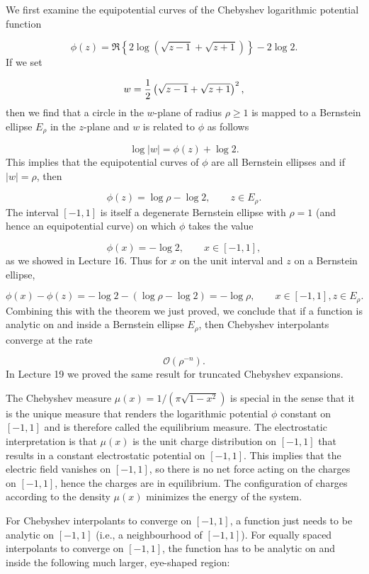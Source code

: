 \documentclass[12pt,a4paper]{article}
\begin{document}
We first examine the equipotential curves of the Chebyshev logarithmic potential function

\[
\phi(z) =  \Re \left\lbrace 2\log(\sqrt{z-1} + \sqrt{z+1})  \right\rbrace  -2 \log 2.
\]
If we set

\[
w = {1 \over 2}\left( \sqrt{z-1} + \sqrt{z+1} \right)^2,
\]
then we find that a circle in the $w$-plane of radius $\rho \geq 1$ is mapped to a Bernstein ellipse $E_{\rho}$ in the $z$-plane and $w$ is related to $\phi$ as follows

\[
\log\vert w \vert = \phi(z) + \log 2.
\]
This implies that the equipotential curves of $\phi$ are all Bernstein ellipses and if $\vert w \vert = \rho$, then

\[
\phi(z) = \log \rho - \log 2, \qquad z \in E_{\rho}.
\]
The interval $[-1, 1]$ is itself a degenerate Bernstein ellipse with $\rho = 1$ (and hence an equipotential curve) on which $\phi$ takes the value

\[
\phi(x) = -\log 2, \qquad x \in [-1, 1],
\]
as we showed in Lecture 16. Thus for $x$ on the unit interval and $z$ on a Bernstein ellipse,

\[
\phi(x) - \phi(z) = -\log 2 - (\log \rho - \log 2) = - \log \rho, \qquad x \in [-1, 1], z \in E_{\rho}.
\]
Combining this with the theorem we just proved, we conclude that if a function is analytic on and inside a Bernstein ellipse $E_{\rho}$, then Chebyshev interpolants converge at the rate

\[
\mathcal{O}\left( \rho^{-n} \right).
\]
In Lecture 19 we proved the same result for truncated Chebyshev expansions.

The Chebyshev measure $\mu(x) = 1/(\pi\sqrt{1-x^2})$ is special in the sense that it  is the unique measure that renders the logarithmic potential  $\phi$ constant on $[-1,1]$ and is therefore called the equilibrium measure. The electrostatic interpretation is that $\mu(x)$ is the unit charge distribution on $[-1, 1]$ that results in a constant electrostatic potential on $[-1, 1]$. This implies that the electric field vanishes on $[-1, 1]$, so there is no net force acting on the charges on $[-1, 1]$, hence the charges are in equilibrium. The configuration of charges according to the density $\mu(x)$ minimizes the energy of the system.

For Chebyshev interpolants to converge on $[-1, 1]$, a function just needs to be analytic on $[-1, 1]$ (i.e., a neighbourhood of $[-1, 1]$). For equally spaced interpolants to converge on $[-1, 1]$, the function has to be analytic on and inside the following much larger, eye-shaped region:
\end{document}
